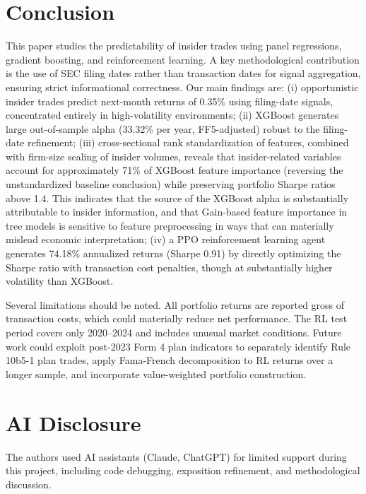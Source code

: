 \documentclass{article}
\begin{document}
\section{Conclusion}

This paper studies the predictability of insider trades using panel regressions, gradient boosting, and reinforcement learning. A key methodological contribution is the use of SEC filing dates rather than transaction dates for signal aggregation, ensuring strict informational correctness. Our main findings are: (i) opportunistic insider trades predict next-month returns of 0.35\% using filing-date signals, concentrated entirely in high-volatility environments; (ii) XGBoost generates large out-of-sample alpha (33.32\% per year, FF5-adjusted) robust to the filing-date refinement; (iii) cross-sectional rank standardization of features, combined with firm-size scaling of insider volumes, reveals that insider-related variables account for approximately 71\% of XGBoost feature importance (reversing the unstandardized baseline conclusion) while preserving portfolio Sharpe ratios above 1.4. This indicates that the source of the XGBoost alpha is substantially attributable to insider information, and that Gain-based feature importance in tree models is sensitive to feature preprocessing in ways that can materially mislead economic interpretation; (iv) a PPO reinforcement learning agent generates 74.18\% annualized returns (Sharpe 0.91) by directly optimizing the Sharpe ratio with transaction cost penalties, though at substantially higher volatility than XGBoost.

Several limitations should be noted. All portfolio returns are reported gross of transaction costs, which could materially reduce net performance. The RL test period covers only 2020--2024 and includes unusual market conditions. Future work could exploit post-2023 Form 4 plan indicators to separately identify Rule 10b5-1 plan trades, apply Fama-French decomposition to RL returns over a longer sample, and incorporate value-weighted portfolio construction.

\section*{AI Disclosure}
\small
The authors used AI assistants (Claude, ChatGPT) for limited support during this project, including code debugging, exposition refinement, and methodological discussion. 
\end{document}

